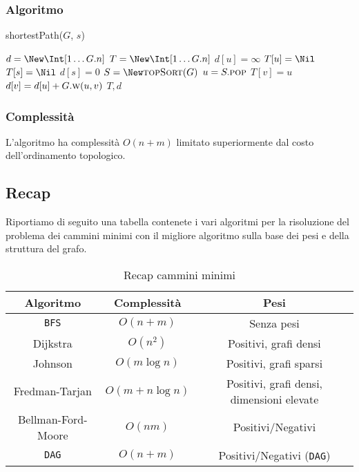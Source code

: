         \subsubsection{Algoritmo}
            \begin{algorithm}[H]
                \caption{shortestPath(\Graph $G$, \Node $s$)}
                \begin{algorithmic}
                    \State \Int[] $d = \New \Int[1\dots G.n]$
                    \State \Int[] $T = \New \Int[1\dots G.n]$
                        \State $d[u]=\infty$
                        \State $T[u]=\Nil$
                    \EndFor
                    \State $T[s]=\Nil$
                    \State $d[s]=0$
                    \State \Stack $S = \New \textsc{topSort}(G)$
                        \State \Node $u = S.\Call{pop}{}$
                                \State $T[v]=u$
                                \State $d[v]=d[u]+G.\Call{w}{u,v}$
                            \EndIf
                        \EndFor
                    \EndWhile
                    \State \Return $T,d$
                \end{algorithmic}
            \end{algorithm}
        \subsubsection{Complessità}
            L'algoritmo ha complessità $O(n+m)$ limitato superiormente dal costo dell'ordinamento topologico.
    \subsection{Recap}
        Riportiamo di seguito una tabella contenete i vari algoritmi per la risoluzione del problema dei cammini minimi con il migliore algoritmo sulla base dei pesi e della struttura del grafo.
        \begin{table}[H]
            \centering
            \begin{tabular}{|c|c|c|}
                \hline
                \textbf{Algoritmo} & \textbf{Complessità} & \textbf{Pesi} \\
                \hline
                \texttt{BFS} & $O(n+m)$ & Senza pesi \\
                Dijkstra & $O(n^2)$ & Positivi, grafi densi \\
                Johnson & $O(m\log n)$ & Positivi, grafi sparsi \\
                Fredman-Tarjan & $O(m+n\log n)$ & Positivi, grafi densi, dimensioni elevate \\
                Bellman-Ford-Moore & $O(nm)$ & Positivi/Negativi \\
                \texttt{DAG} & $O(n+m)$ & Positivi/Negativi (\texttt{DAG}) \\
                \hline
            \end{tabular}
            \caption{Recap cammini minimi}
            \label{tab:recapCamminiMinimi}
        \end{table}
